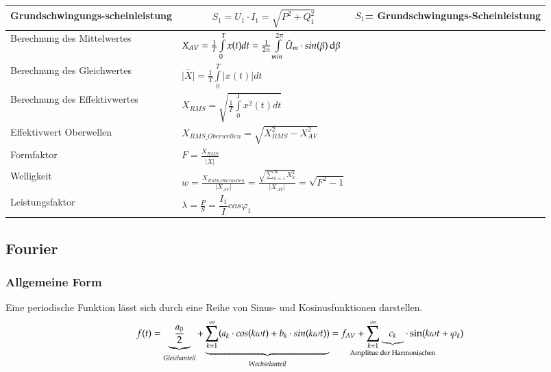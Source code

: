 \begin{longtable}{| p{} | p{} |p{}|}
    \textbf{\color{green}Grundschwingungs-\newline scheinleistung}&
    \vspace{-0.5cm}\[ S_1=U_1\cdot I_1 = \sqrt{P^2+Q_1^2} \]\vspace{-0.5cm}&
    $ S_1 $= Grundschwingungs-Scheinleistung
    \\ \hline    
    \hline
    Berechnung des Mittelwertes&
    $X_{AV} = \frac{1}{T}\int\limits_{0}^{T}x(t)dt = \frac{1}{2\pi}\int\limits_{min}^{2\pi}\hat{U}_m\cdot sin(\beta)\mathop{}\!\mathrm{d} \beta$
    &\\
    \hline
    Berechnung des Gleichwertes
    & $\overline{|X|} = \frac{1}{T} \int\limits_{0}^{T} |x(t)|dt$
    &\\
    \hline
    Berechnung des Effektivwertes
    & $X_{RMS} = \sqrt{\frac{1}{T}\int\limits_{0}^{T}x^2(t)dt}$
    &\\
    \hline
    Effektivwert Oberwellen
    & $X_{RMS\_Oberwellen} = \sqrt{X_{RMS}^2 - X_{AV}^2}$
    &\\
    \hline
    Formfaktor
    & $F = \frac{X_{RMS}}{\overline{|X|}}$
    &\\
    \hline
    Welligkeit
    & $w = \frac{X_{RMS\_Oberwellen}}{|X_{AV}|}= \frac{\sqrt{\sum\limits_{k = 1}^{\infty}X_{k}^2}}{|X_{AV}|} = \sqrt{F^2-1}$
    &\\
    \hline
    Leistungsfaktor&
    $ \lambda = \frac{P}{S} = \dfrac{I_1}{I}cos\varphi_1 $
    &\\ \hline 
\end{longtable}
\clearpage

\subsection{Fourier}%
\subsubsection{Allgemeine Form}
Eine periodische Funktion lässt sich durch eine Reihe von Sinus- und Kosinusfunktionen darstellen.
$$f(t) = \underbrace{\frac{a_{0}}{2}}_{Gleichanteil}+\underbrace{\sum_{k = 1}^{\infty} (a_{k} \cdot cos(k \omega t)+ b_{k} \cdot sin(k \omega t))}_{Wechselanteil} = f_{AV}+ \sum_{k = 1}^{\infty} \underbrace{c_k}_{\makebox[0pt]{\text{\scriptsize Amplitue der Harmonischen}}} \cdot \sin(k\omega t + \varphi_k)$$


